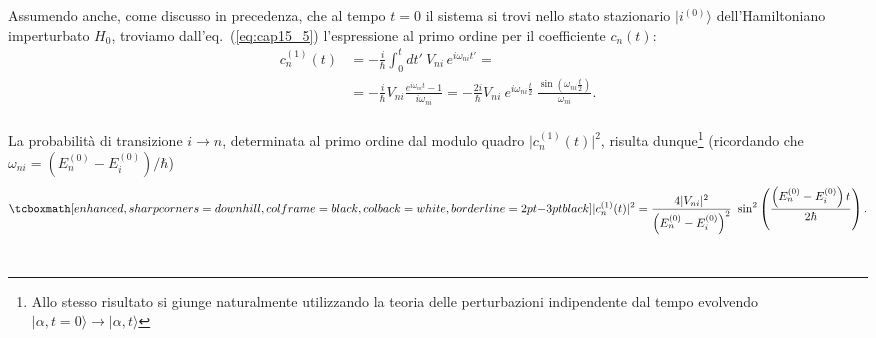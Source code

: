 Assumendo anche, come discusso in precedenza, che al tempo $t=0$ il sistema si trovi nello stato stazionario $\vert i^{(0)}\rangle $ dell'Hamiltoniano imperturbato $H_0$, troviamo dall'eq.~(\ref{eq:cap15_5}) l'espressione al primo ordine per il coefficiente $c_n (t)$:
	\begin{align}
		c_n ^{(1)} (t) & =  -\frac{i}{\hbar} \int _0 ^t dt'\ V_{ni}\, e^{i \omega _{ni} t'} = \nonumber \\
		&= -\frac{i}{\hbar} V_{ni} \frac{e^{i \omega _{ni} t}-1}{i \omega _{ni}}= -\frac{2i}{\hbar} V_{ni}\ e^{i \omega _{ni} \frac{t}{2}}\ \frac{\sin{\left(\omega _{ni} \frac{t}{2}\right)}}{\omega _{ni}} .
	\end{align}\\
	
La probabilità di transizione $i\rightarrow n $, determinata al primo ordine dal modulo quadro $\vert c_n ^{(1)} (t) \vert ^2$, risulta dunque\footnote{Allo stesso risultato si giunge naturalmente utilizzando la teoria delle perturbazioni indipendente dal tempo evolvendo $ \vert \alpha , t =0 \rangle \rightarrow \vert \alpha , t \rangle$} (ricordando che $\omega _{ni} = ( E_n ^{(0)}- E_i ^{(0)})/ \hbar$)
	\begin{equation}
		\tcboxmath[enhanced, sharp corners=downhill, colframe=black, colback=white, borderline={2pt}{-3pt}{black}]{
			\vert c_n ^{(1)} (t) \vert ^2 = \frac{4\vert V_{ni} \vert ^2}{\left( E_n ^{(0)} - E_i ^{(0)} \right) ^2}\ \sin ^2\left(\frac{\left( E_n ^{(0)} - E_i ^{(0)} \right) t}{2 \hbar}\right).
			}
	\label{eq:cap15_6}
	\end{equation}\\
	

